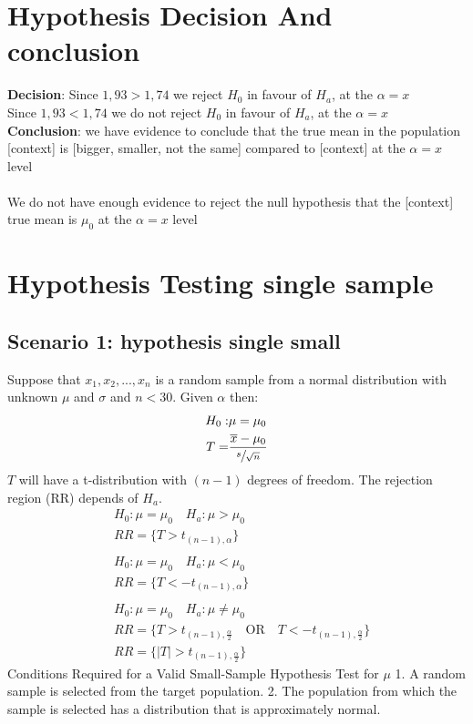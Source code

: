 \documentclass[fontsize=6pt, paper=a4]{scrartcl}
\begin{document}
\begin{multicols*}{4}
{\section{Hypothesis Decision And conclusion}
\textbf{Decision}: Since $1,93 > 1,74$ we reject $H_0$ in favour of $H_a$, at the $\alpha=x$\\
Since $1,93 < 1,74$ we do not reject $H_0$ in favour of $H_a$, at the $\alpha=x$\\

\textbf{Conclusion}: we have evidence to conclude that the true mean in the population [context] is [bigger, smaller, not the same] compared to [context] at the $\alpha=x$ level\\ \\
We do not have enough evidence to reject the null hypothesis that the [context] true mean is $\mu_0$ at the $\alpha=x$ level


\section{Hypothesis Testing single sample}
\subsection{Scenario 1: hypothesis single small}
Suppose that $x_1, x_2,...,x_n$ is a random sample from a normal distribution with unknown $\mu$ and $\sigma$ and \underline{$n<30$}. Given $\alpha$ then:
\begin{align}
	H_0:&\mu=\mu_0\\
	T=&\frac{\overline{x}-\mu_0}{\sfrac{s}{\sqrt{n}}}
\end{align}
$T$ will have a t-distribution with $(n-1)$ degrees of freedom. The rejection region (RR) depends of $H_a$.
\begin{align}
	&H_0:\mu=\mu_0 \quad H_a:\mu >\mu_0\\
	&RR= \{ T> t_{(n-1), \alpha}\}\\ \\
	&H_0:\mu=\mu_0 \quad H_a:\mu <\mu_0\\
	&RR= \{ T< -t_{(n-1), \alpha}\}\\ \\
	&H_0:\mu=\mu_0 \quad H_a:\mu \neq \mu_0\\
	&RR= \{ T> t_{(n-1), \frac{\alpha}{2}} \quad \textrm{OR} \quad T<- t_{(n-1), \frac{\alpha}{2}}\} \\
	&RR= \{ \left|T\right|> t_{(n-1), \frac{\alpha}{2}}\}
\end{align}
Conditions Required for a Valid Small-Sample Hypothesis Test for $\mu$
1. A random sample is selected from the target population.
2. The population from which the sample is selected has a distribution that is approximately normal.
}
\end{multicols*}
\end{document}
